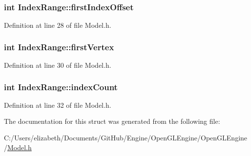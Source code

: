 \subsubsection[{\texorpdfstring{first\+Index\+Offset}{firstIndexOffset}}]{\setlength{\rightskip}{0pt plus 5cm}int Index\+Range\+::first\+Index\+Offset}\hypertarget{struct_index_range_a0e0e760f6a861003bf6be8466671e1b5}{}\label{struct_index_range_a0e0e760f6a861003bf6be8466671e1b5}


Definition at line 28 of file Model.\+h.

\subsubsection[{\texorpdfstring{first\+Vertex}{firstVertex}}]{\setlength{\rightskip}{0pt plus 5cm}int Index\+Range\+::first\+Vertex}\hypertarget{struct_index_range_a2e9aff1a8e3762185aada41ff99c5cfc}{}\label{struct_index_range_a2e9aff1a8e3762185aada41ff99c5cfc}


Definition at line 30 of file Model.\+h.

\subsubsection[{\texorpdfstring{index\+Count}{indexCount}}]{\setlength{\rightskip}{0pt plus 5cm}int Index\+Range\+::index\+Count}\hypertarget{struct_index_range_ab1928b14e6f6877973fa6679257385bb}{}\label{struct_index_range_ab1928b14e6f6877973fa6679257385bb}


Definition at line 32 of file Model.\+h.



The documentation for this struct was generated from the following file\+:\begin{DoxyCompactItemize}
\item 
C\+:/\+Users/elizabeth/\+Documents/\+Git\+Hub/\+Engine/\+Open\+G\+L\+Engine/\+Open\+G\+L\+Engine/\hyperlink{_model_8h}{Model.\+h}\end{DoxyCompactItemize}
